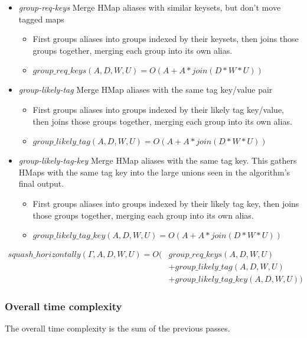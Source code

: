 \begin{itemize}
	\item \emph{group-req-keys} Merge HMap aliases with similar keysets, but
		don't move tagged maps
		\begin{itemize}
			\item First groups aliases into groups indexed by their keysets, then
					joins those groups together, merging each group into its own alias.
			\item $group\_req\_keys(A,D,W,U) = O(A + A*join(D*W*U))$
		\end{itemize}
	\item \emph{group-likely-tag} Merge HMap aliases with the same tag key/value pair
		\begin{itemize}
			\item First groups aliases into groups indexed by their likely tag key/value, then
					joins those groups together, merging each group into its own alias.
			\item $group\_likely\_tag(A,D,W,U) = O(A + A*join(D*W*U))$
		\end{itemize}
	\item \emph{group-likely-tag-key} Merge HMap aliases with the same tag key.
			  This gathers HMaps with the same tag key into the large unions seen in the algorithm's
				final output.
		\begin{itemize}
			\item First groups aliases into groups indexed by their likely tag key, then
					joins those groups together, merging each group into its own alias.
			\item $group\_likely\_tag\_key(A,D,W,U) = O(A + A*join(D*W*U))$
		\end{itemize}
\end{itemize}

\begin{align*}
squash\_horizontally(\Gamma, A, D, W, U) = O(&group\_req\_keys(A,D,W,U)\\
								  													 &+ group\_likely\_tag(A,D,W,U) \\
								  												   &+ group\_likely\_tag\_key(A,D,W,U))
\end{align*}

\subsubsection{Overall time complexity}
\label{overall-time-complexity}
The overall time complexity is the sum of the previous passes.

